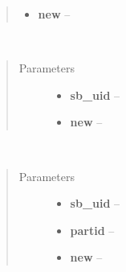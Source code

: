 \documentclass[a4paper,10pt,english]{sphinxmanual}
\begin{document}
\begin{fulllineitems}
\begin{fulllineitems}
\begin{quote}
\begin{description}
\begin{itemize}
\item {} 
\textbf{new} -- 

\end{itemize}

\end{description}\end{quote}

\end{fulllineitems}


\begin{fulllineitems}
\label{wtoapi:wtoDatabase.WtoDatabase.row_schedblock_info}~\begin{quote}\begin{description}
\item[{Parameters}] \leavevmode\begin{itemize}
\item {} 
\textbf{sb\_uid} -- 

\item {} 
\textbf{new} -- 

\end{itemize}

\end{description}\end{quote}

\end{fulllineitems}


\begin{fulllineitems}
\label{wtoapi:wtoDatabase.WtoDatabase.row_schedblocks}~\begin{quote}\begin{description}
\item[{Parameters}] \leavevmode\begin{itemize}
\item {} 
\textbf{sb\_uid} -- 

\item {} 
\textbf{partid} -- 

\item {} 
\textbf{new} -- 

\end{itemize}

\end{description}\end{quote}


\end{fulllineitems}
\end{fulllineitems}
\end{document}
